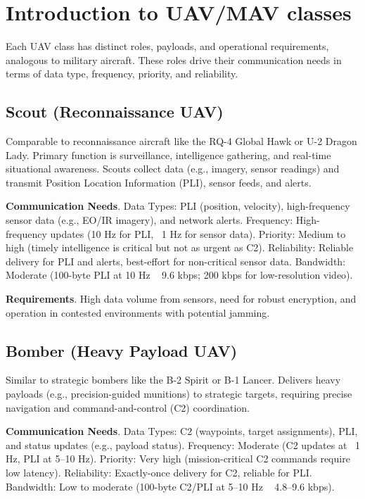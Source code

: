 \documentclass{article}
\begin{document}
\newpage
\tableofcontents

\section{Introduction to UAV/MAV classes}
Each UAV class has distinct roles, payloads, and operational requirements,
analogous to military aircraft. These roles drive their communication needs
in terms of data type, frequency, priority, and reliability.

\subsection{Scout (Reconnaissance UAV)}
Comparable to reconnaissance aircraft like the RQ-4 Global Hawk or U-2 Dragon Lady.
Primary function is surveillance, intelligence gathering, and real-time situational awareness.
Scouts collect data (e.g., imagery, sensor readings) and transmit Position Location
Information (PLI), sensor feeds, and alerts.

\textbf{Communication Needs}.
Data Types: PLI (position, velocity), high-frequency sensor data (e.g., EO/IR imagery), and network alerts.
Frequency: High-frequency updates (10 Hz for PLI, ~1 Hz for sensor data).
Priority: Medium to high (timely intelligence is critical but not as urgent as C2).
Reliability: Reliable delivery for PLI and alerts, best-effort for non-critical sensor data.
Bandwidth: Moderate (100-byte PLI at 10 Hz ~ 9.6 kbps; 200 kbps for low-resolution video).

\textbf{Requirements}.
High data volume from sensors, need for robust encryption,
and operation in contested environments with potential jamming.

\subsection{Bomber (Heavy Payload UAV)}
Similar to strategic bombers like the B-2 Spirit or B-1 Lancer.
Delivers heavy payloads (e.g., precision-guided munitions) to strategic targets,
requiring precise navigation and command-and-control (C2) coordination.

\textbf{Communication Needs}.
Data Types: C2 (waypoints, target assignments), PLI, and status updates (e.g., payload status).
Frequency: Moderate (C2 updates at ~1 Hz, PLI at 5–10 Hz).
Priority: Very high (mission-critical C2 commands require low latency).
Reliability: Exactly-once delivery for C2, reliable for PLI.
Bandwidth: Low to moderate (100-byte C2/PLI at 5–10 Hz ~ 4.8–9.6 kbps).
\end{document}
